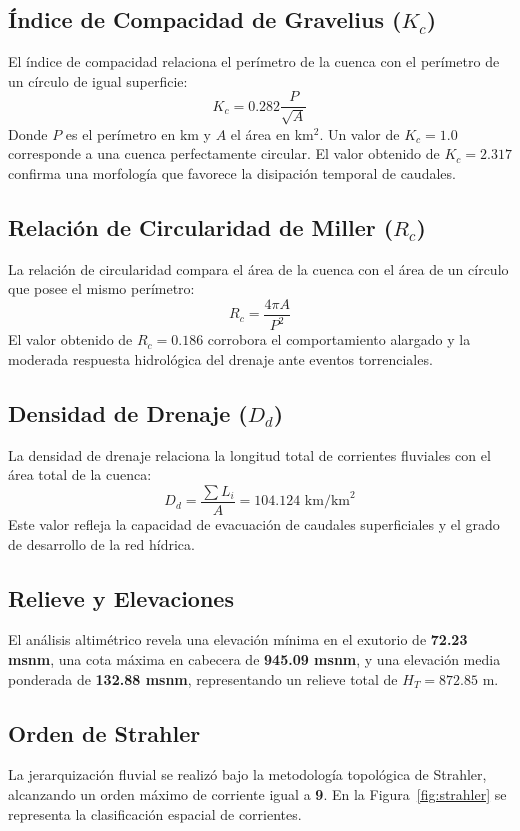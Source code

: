 \documentclass[11pt,a4paper]{article}
\begin{document}
\subsection{Índice de Compacidad de Gravelius ($K_c$)}
El índice de compacidad relaciona el perímetro de la cuenca con el perímetro de un círculo de igual superficie:
\begin{equation}
K_c = 0.282 \frac{P}{\sqrt{A}}
\end{equation}
Donde $P$ es el perímetro en km y $A$ el área en km$^2$. Un valor de $K_c = 1.0$ corresponde a una cuenca perfectamente circular. El valor obtenido de $K_c = 2.317$ confirma una morfología que favorece la disipación temporal de caudales.

\subsection{Relación de Circularidad de Miller ($R_c$)}
La relación de circularidad compara el área de la cuenca con el área de un círculo que posee el mismo perímetro:
\begin{equation}
R_c = \frac{4 \pi A}{P^2}
\end{equation}
El valor obtenido de $R_c = 0.186$ corrobora el comportamiento alargado y la moderada respuesta hidrológica del drenaje ante eventos torrenciales.

\subsection{Densidad de Drenaje ($D_d$)}
La densidad de drenaje relaciona la longitud total de corrientes fluviales con el área total de la cuenca:
\begin{equation}
D_d = \frac{\sum L_i}{A} = 104.124 \text{ km/km}^2
\end{equation}
Este valor refleja la capacidad de evacuación de caudales superficiales y el grado de desarrollo de la red hídrica.

\subsection{Relieve y Elevaciones}
El análisis altimétrico revela una elevación mínima en el exutorio de \textbf{72.23 msnm}, una cota máxima en cabecera de \textbf{945.09 msnm}, y una elevación media ponderada de \textbf{132.88 msnm}, representando un relieve total de $H_T = 872.85$ m.

\subsection{Orden de Strahler}
La jerarquización fluvial se realizó bajo la metodología topológica de Strahler, alcanzando un orden máximo de corriente igual a \textbf{9}. En la Figura~\ref{fig:strahler} se representa la clasificación espacial de corrientes.
\end{document}
